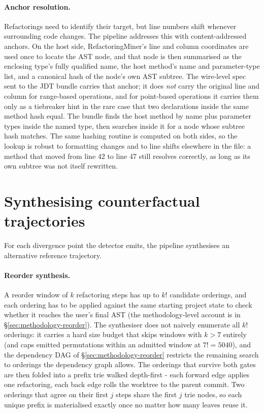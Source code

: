 \paragraph{Anchor resolution.}
Refactorings need to identify their target, but line numbers shift whenever surrounding code changes. The pipeline addresses this with content-addressed anchors. On the host side, RefactoringMiner's line and column coordinates are used once to locate the AST node, and that node is then summarised as the enclosing type's fully qualified name, the host method's name and parameter-type list, and a canonical hash of the node's own AST subtree. The wire-level spec sent to the JDT bundle carries that anchor; it does \emph{not} carry the original line and column for range-based operations, and for point-based operations it carries them only as a tiebreaker hint in the rare case that two declarations inside the same method hash equal. The bundle finds the host method by name plus parameter types inside the named type, then searches inside it for a node whose subtree hash matches. The same hashing routine is computed on both sides, so the lookup is robust to formatting changes and to line shifts elsewhere in the file: a method that moved from line 42 to line 47 still resolves correctly, as long as its own subtree was not itself rewritten.

\section{Synthesising counterfactual trajectories}
\label{sec:arch-synthesis}

For each divergence point the detector emits, the pipeline synthesises an alternative reference trajectory.

\paragraph{Reorder synthesis.}
\label{sec:arch-reorder-engine}
A reorder window of $k$ refactoring steps has up to $k!$ candidate orderings, and each ordering has to be applied against the same starting project state to check whether it reaches the user's final AST (the methodology-level account is in \S\ref{sec:methodology-reorder}). The synthesiser does not naively enumerate all $k!$ orderings: it carries a hard size budget that skips windows with $k > 7$ entirely (and caps emitted permutations within an admitted window at $7! = 5040$), and the dependency DAG of \S\ref{sec:methodology-reorder} restricts the remaining search to orderings the dependency graph allows. The orderings that survive both gates are then folded into a prefix trie walked depth-first - each forward edge applies one refactoring, each back edge rolls the worktree to the parent commit. Two orderings that agree on their first $j$ steps share the first $j$ trie nodes, so each unique prefix is materialised exactly once no matter how many leaves reuse it.

